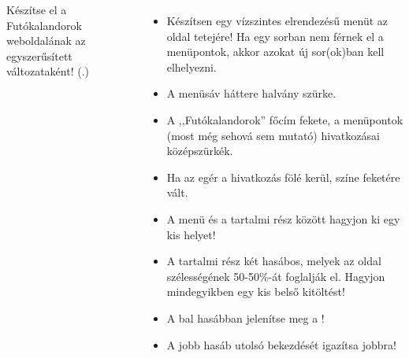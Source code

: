\begin{frame}
  \begin{columns}[T]
      \footnotesize
      Készítse el a Futókalandorok weboldalának  az  egyszerűsített változataként! (.)
      \begin{itemize}
        \item Készítsen egy vízszintes elrendezésű menüt az oldal tetejére! Ha egy sorban nem férnek el a menüpontok, akkor azokat új sor(ok)ban kell elhelyezni.
        \item A menüsáv háttere halvány szürke.
        \item A ,,Futókalandorok'' főcím fekete, a menüpontok (most még sehová sem mutató) hivatkozásai középszürkék.
        \item Ha az egér a hivatkozás fölé kerül, színe feketére vált.
        \item A menü és a tartalmi rész között hagyjon ki egy kis helyet!
        \item A tartalmi rész két hasábos, melyek az oldal szélességének 50-50\%-át foglalják el. Hagyjon mindegyikben egy kis belső kitöltést!
        \item A bal hasábban jelenítse meg a !
        \item A jobb hasáb utolsó bekezdését igazítsa jobbra!
      \end{itemize}

\end{columns}
\end{frame}
